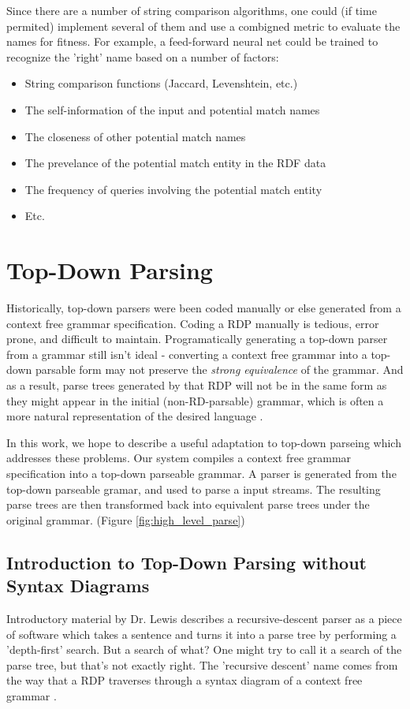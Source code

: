 \documentclass[11pt]{article}
\begin{document}
Since there are a number of string comparison algorithms, one could
(if time permited) implement several of them and use a combigned
metric to evaluate the names for fitness. For example,
a feed-forward neural net could be trained to recognize the 'right'
name based on a number of factors:
\begin{itemize}
\item String comparison functions (Jaccard, Levenshtein, etc.)
\item The self-information \cite{shannon} of the input and potential match names
\item The closeness of other potential match names
\item The prevelance of the potential match entity in the RDF data
\item The frequency of queries involving the potential match entity
\item Etc.
\end{itemize}

\section{Top-Down Parsing}
Historically, top-down parsers were been coded manually or else generated from 
a context free grammar specification. \cite{lewis, formal_langs} 
Coding a RDP manually is tedious, error prone, and difficult to maintain.
Programatically generating a top-down parser from a grammar
still isn't ideal - converting a context free grammar into
a top-down parsable form may not preserve the {\em strong equivalence} of the grammar.
And as a result, parse trees generated by that RDP will not be in the same form
as they might appear in the initial (non-RD-parsable) grammar, which is often a more 
natural representation of the desired language \cite{compiler}.

In this work, we hope to describe a useful adaptation to top-down parseing
which addresses these problems. Our system compiles a context free grammar 
specification into a top-down parseable grammar.
A parser is generated from the top-down parseable gramar,
and used to parse a input streams. 
The resulting parse trees are then transformed back into equivalent
parse trees under the original grammar. (Figure \ref{fig:high_level_parse})

\subsection{Introduction to Top-Down Parsing without Syntax Diagrams}
\label{rd_wo_sd}
Introductory material by Dr. Lewis \cite{lewis} describes a recursive-descent parser 
as a piece of software which takes a sentence and turns it into a parse tree by performing a 'depth-first' search. 
But a search of what? One might try to call it a search of the parse tree, but that's not exactly right.
The 'recursive descent' name comes from the way that a RDP traverses through a
syntax diagram of a context free grammar \cite{compiler}.
\end{document}
